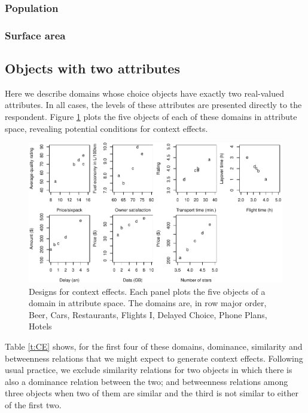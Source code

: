 \documentclass[11pt,letter]{article}
\begin{document}


\subsubsection{Population}



\subsubsection{Surface area}



\subsection{Objects with two attributes}

Here we describe domains whose choice objects have exactly two real-valued attributes.
In all cases, the levels of these attributes are presented directly to the respondent.
Figure \ref{f:CE} plots the five objects of each of these domains in attribute space, revealing potential conditions for context effects.

\begin{figure}
	\caption{Designs for context effects. Each panel plots the five objects of a domain in attribute space. The domains are, in row major order, Beer, Cars, Restaurants, Flights I, Delayed Choice, Phone Plans, Hotels}\label{f:CE}
	\centering
	\includegraphics[width=15cm]{./Figures/design_patterns.pdf}
\end{figure}

Table \ref{t:CE} shows, for the first four of these domains, dominance, similarity and betweenness relations that we might expect to generate context effects.
Following usual practice, we exclude similarity relations for two objects in which there is also a dominance relation between the two; and betweenness relations among three objects when two of them are similar and the third is not similar to either of the first two.
\end{document}
